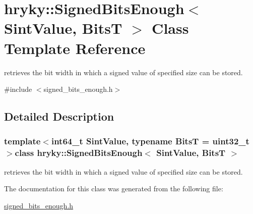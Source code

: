 \hypertarget{classhryky_1_1_signed_bits_enough}{\section{hryky\-:\-:Signed\-Bits\-Enough$<$ Sint\-Value, Bits\-T $>$ Class Template Reference}
\label{classhryky_1_1_signed_bits_enough}
}


retrieves the bit width in which a signed value of specified size can be stored.  




{\ttfamily \#include $<$signed\-\_\-bits\-\_\-enough.\-h$>$}



\subsection{Detailed Description}
\subsubsection*{template$<$int64\-\_\-t Sint\-Value, typename Bits\-T = uint32\-\_\-t$>$class hryky\-::\-Signed\-Bits\-Enough$<$ Sint\-Value, Bits\-T $>$}

retrieves the bit width in which a signed value of specified size can be stored. 

The documentation for this class was generated from the following file\-:\begin{DoxyCompactItemize}
\item 
\hyperlink{signed__bits__enough_8h}{signed\-\_\-bits\-\_\-enough.\-h}\end{DoxyCompactItemize}
